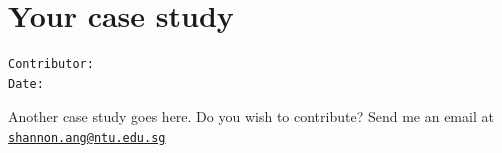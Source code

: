\documentclass[openany]{book}
\begin{document}
\chapter{Your case study}\label{case3}

\begin{verbatim}
Contributor: 
Date: 
\end{verbatim}

Another case study goes here. Do you wish to contribute? Send me an
email at
\href{mailto:shannon.ang@ntu.edu.sg}{\nolinkurl{shannon.ang@ntu.edu.sg}}


\end{document}
